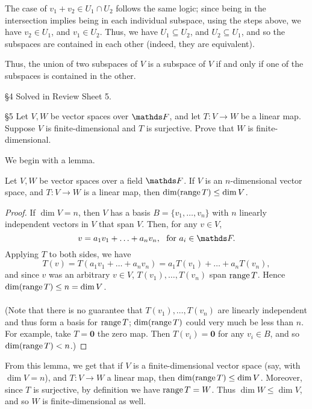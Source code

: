 \documentclass{homework}
\begin{document}
\begin{solution}
\begin{enumerate}[label=(\alph*)]
  The case of $ v_1+v_2\in U_1\cap U_2$ follows the same logic; since being in the intersection
  implies being in each individual subspace, using the steps above, we have $ v_2\in U_1$, and $
  v_1\in U_2$. Thus, we have $U_1\subseteq U_2$, and $ U_2\subseteq U_1$, and so the subspaces are
  contained in each other (indeed, they are equivalent).

  Thus, the union of two subspaces of $V$ is a subspace of $V$ if and only if one of the subspaces
  is contained in the other.
  \end{enumerate}
\end{solution}

\begin{problem}{\S 4}
  Solved in Review Sheet 5.
\end{problem}

\begin{problem}{\S 5}
  Let $V,W$ be vector spaces over $\F$, and let $T:V\to W$ be a linear map. Suppose $V$ is
  finite-dimensional and $T$ is surjective. Prove that $W$ is finite-dimensional.
\end{problem}

\begin{solution}
  We begin with a lemma.
  \begin{lemma}[]{}
    Let $V,W$ be vector spaces over a field $\F$. If $V$ is an $n$-dimensional vector space, and
    $T:V\to W$ is a linear map, then $\dim(\operatorname{range} T) \le \dim V$.
  \end{lemma}
  \begin{proof}[Proof]
    If $\dim V=n$, then $V$ has a basis $B=\{ v_1,\ldots,v_n \}$ with $n$ linearly independent
    vectors in $V$ that span $V$. Then, for any $v\in V$,\[
      v=a_1v_1+\ldots+a_nv_n,\ ~\text{for}~a_i\in \F
    .\] Applying $T$ to both sides, we have \[
      T(v) = T(a_1v_1+\ldots+a_nv_n)= a_1T(v_1)+\ldots+a_nT(v_n)
    ,\] and since $v$ was an arbitrary $v\in V$, $T(v_1),\ldots,T(v_n)$ span $\operatorname{range} T$. Hence
    $\dim(\operatorname{range} T) \le n = \dim V$.\\\\
    (Note that there is no guarantee that $T(v_1),\ldots,T(v_n)$ are linearly independent and thus 
    form a basis for $\operatorname{range} T$; $\dim(\operatorname{range} T)$ could very much be less than $n$. For example,
    take $T=\textbf{0}$ the zero map. Then $T(v_i)=\textbf{0}$ for any $v_i\in B$, and so
    $\dim(\operatorname{range} T) < n$.)
  \end{proof}
  

  From this lemma, we get that if $V$ is a finite-dimensional vector space (say, with $\dim V = n$),
  and $T:V\to W$ a linear map, then $\dim(\operatorname{range} T) \le  \dim V$. Moreover, since $T$ is surjective,
  by definition we have $\operatorname{range} T = W$. Thus $\dim W \le \dim V$, and so $W$ is finite-dimensional
  as well.
\end{solution}
\end{document}
